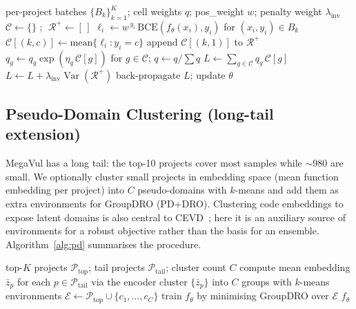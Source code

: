 \documentclass[conference]{IEEEtran}
\begin{document}
\begin{algorithm}[t]
\caption{CC-DRO optimisation step}
\label{alg:ccdro}
\begin{algorithmic}[1]
\Require per-project batches $\{B_k\}_{k=1}^{K}$; cell weights
$q$; pos\_weight $w$; penalty weight $\lambda_{\text{inv}}$
\State $\mathcal{C}\gets\{\}$ ;
$\;\mathcal{R}^{+}\gets[\,]$
  \State $\ell_i \gets w^{\,y_i}\,\mathrm{BCE}(f_\theta(x_i),y_i)$
  for $(x_i,y_i)\in B_k$
     \State $\mathcal{C}[(k,c)] \gets \mathrm{mean}\{\ell_i : y_i=c\}$
  \EndFor
     \State append $\mathcal{C}[(k,1)]$ to $\mathcal{R}^{+}$
  \EndIf
\EndFor
\State $q_g \gets q_g\exp(\eta_q\,\mathcal{C}[g])$ for $g\in\mathcal{C}$;\;
$q\gets q/\sum q$ 
\State $L \gets \sum_{g\in\mathcal{C}} q_g\,\mathcal{C}[g]$
  \State $L \gets L + \lambda_{\text{inv}}\operatorname{Var}(\mathcal{R}^{+})$
\EndIf
\State back-propagate $L$; update $\theta$
\end{algorithmic}
\end{algorithm}

\subsection{Pseudo-Domain Clustering (long-tail extension)}
MegaVul has a long tail: the top-10 projects cover most samples
while $\sim$980 are small. We optionally cluster small projects in
embedding space (mean function embedding per project) into $C$
pseudo-domains with $k$-means and add them as extra environments
for GroupDRO (PD+DRO). Clustering code embeddings to expose latent
domains is also central to CEVD~\cite{cevd}; here it is an
auxiliary source of environments for a robust objective rather
than the basis for an ensemble. Algorithm~\ref{alg:pd} summarises
the procedure.

\begin{algorithm}[t]
\caption{Pseudo-domain construction (PD+DRO)}
\label{alg:pd}
\begin{algorithmic}[1]
\Require top-$K$ projects $\mathcal{P}_{\text{top}}$; tail projects
$\mathcal{P}_{\text{tail}}$; cluster count $C$
\State compute mean embedding $\bar z_p$ for each
$p\in\mathcal{P}_{\text{tail}}$ via the encoder
\State cluster $\{\bar z_p\}$ into $C$ groups with $k$-means
\State environments
$\mathcal{E}\gets\mathcal{P}_{\text{top}}\cup\{c_1,\dots,c_C\}$
\State train $f_\theta$ by minimising GroupDRO over $\mathcal{E}$
\State \Return $f_\theta$
\end{algorithmic}
\end{algorithm}
\end{document}
